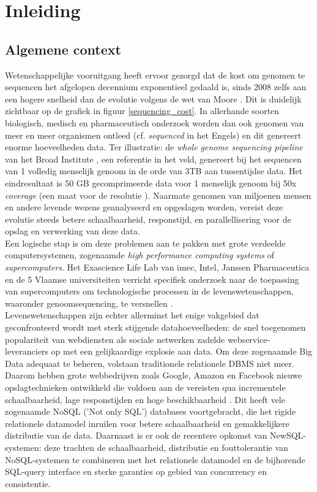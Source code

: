 \chapter{Inleiding}
\label{inleiding}

\section{Algemene context}

Wetenschappelijke vooruitgang heeft ervoor gezorgd dat de kost om genomen te sequencen het afgelopen decennium exponentieel gedaald is, sinds 2008 zelfs aan een hogere snelheid dan de evolutie volgens de wet van Moore \cite{wetterstrand_sequencing_cost}. Dit is duidelijk zichtbaar op de grafiek in figuur \ref{sequencing_cost}. In allerhande soorten biologisch, medisch en pharmaceutisch onderzoek worden dan ook genomen van meer en meer organismen ontleed (cf. \textit{sequenced} in het Engels) en dit genereert enorme hoeveelheden data. Ter illustratie: de \textit{whole genome sequencing pipeline} van het Broad Institute \cite{broad_institute}, een referentie in het veld, genereert bij het sequencen van 1 volledig menselijk genoom in de orde van 3TB aan tussentijdse data. Het eindresultaat is 50 GB gecomprimeerde data voor 1 menselijk genoom bij 50x \textit{coverage} (een maat voor de resolutie \cite{coverage_definition}). Naarmate genomen van miljoenen mensen en andere levende wezens geanalyseerd en opgeslagen worden, vereist deze evolutie steeds betere schaalbaarheid, responstijd, en parallellisering voor de opslag en verwerking van deze data.\\

Een logische stap is om deze problemen aan te pakken met grote verdeelde computersystemen, zogenaamde \textit{high performance computing systems} of \textit{supercomputers}. Het Exascience Life Lab van imec, Intel, Janssen Pharmaceutica en de 5 Vlaamse universiteiten verricht specifiek onderzoek naar de toepassing van supercomputers om technologische processen in de levenswetenschappen, waaronder genoomsequencing, te versnellen \cite{lifelab_bwa}\cite{exascience_life_lab}.\\
Levenswetenschappen zijn echter allerminst het enige vakgebied dat geconfronteerd wordt met sterk stijgende datahoeveelheden: de snel toegenomen populariteit van webdiensten als sociale netwerken zadelde webservice-leveranciers op met een gelijkaardige explosie aan data. Om deze zogenaamde Big Data \cite{mashey1997big} adequaat te beheren, volstaan traditionele relationele DBMS niet meer. Daarom hebben grote webbedrijven zoals Google, Amazon en Facebook nieuwe opslagtechnieken ontwikkeld die voldoen aan de vereisten qua incrementele schaalbaarheid, lage responstijden en hoge beschikbaarheid \cite{baker2011megastore}. Dit heeft vele zogenaamde NoSQL ('Not only SQL') databases voortgebracht, die het rigide relationele datamodel inruilen voor betere schaalbaarheid en gemakkelijkere distributie van de data. Daarnaast is er ook de recentere opkomst van NewSQL-systemen: deze trachten de schaalbaarheid, distributie en fouttolerantie van NoSQL-systemen te combineren met het relationele datamodel en de bijhorende SQL-query interface en sterke garanties op gebied van concurrency en consistentie.

